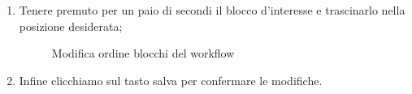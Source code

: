 \begin{enumerate}
	\item Tenere premuto per un paio di secondi il blocco d'interesse e trascinarlo nella posizione desiderata;
	\begin{figure}[!ht]
		\centering
		\caption{Modifica ordine blocchi del workflow}
	\end{figure}
	\item Infine clicchiamo sul tasto salva per confermare le modifiche.
	\begin{figure}[!ht]
		\centering

\end{figure}
\end{enumerate}
